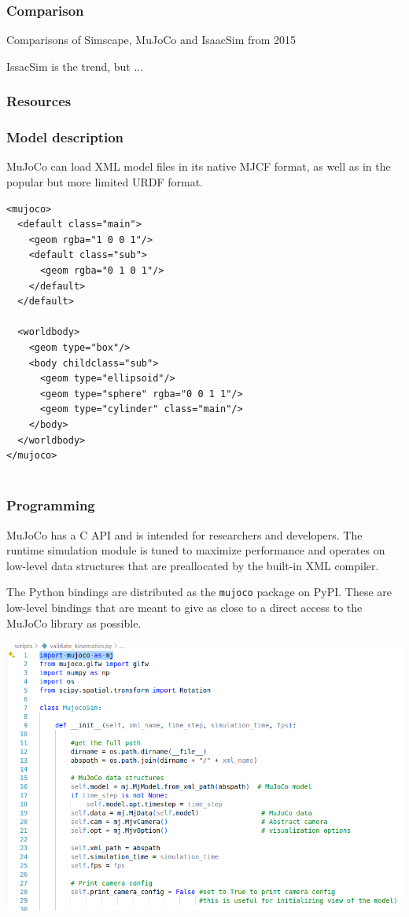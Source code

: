 \documentclass[9pt]{beamer}
\begin{document}
	
	
	
	\begin{frame}
		\frametitle{Comparison}
			Comparisons of Simscape, MuJoCo and IsaacSim from 2015
			
			\scalebox{0.63}{}
			
			IssacSim is the trend, but ...
	\end{frame}


	\begin{frame}
		\frametitle{Resources}
		\scalebox{0.8}{}
	\end{frame}
	
	\begin{frame}[fragile]
		\frametitle{Model description}
		MuJoCo can load XML model files in its native MJCF format, as well as in the popular but more limited URDF format.
	\begin{verbatim}
<mujoco>
  <default class="main">
    <geom rgba="1 0 0 1"/>
    <default class="sub">
      <geom rgba="0 1 0 1"/>
    </default>
  </default>
	
  <worldbody>
    <geom type="box"/>
    <body childclass="sub">
      <geom type="ellipsoid"/>
      <geom type="sphere" rgba="0 0 1 1"/>
      <geom type="cylinder" class="main"/>
    </body>
  </worldbody>
</mujoco>
		
	\end{verbatim}
	\end{frame}
	
	\begin{frame}
		\frametitle{Programming}
		MuJoCo has a C API and is intended for researchers and developers. The runtime simulation module is tuned to maximize performance and operates on low-level data structures that are preallocated by the built-in XML compiler. 
		
		The Python bindings are distributed as the \texttt{mujoco} package on PyPI. These are low-level bindings that are meant to give as close to a direct access to the MuJoCo library as possible.
		
		\begin{center}
			\includegraphics[width=0.7\linewidth]{images/gg-colab}
		\end{center}
	\end{frame}
\end{document}
